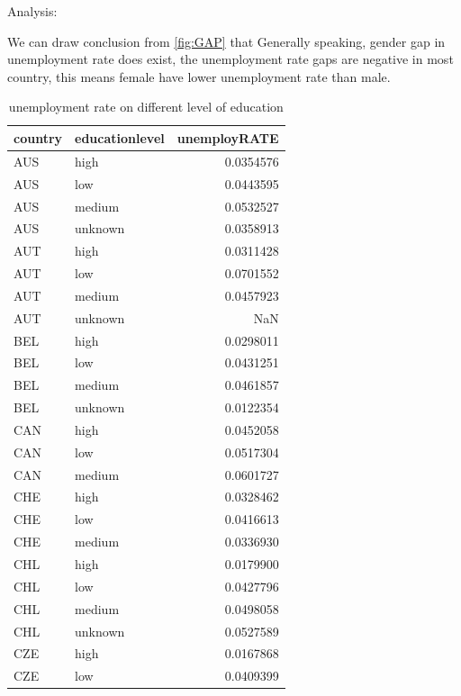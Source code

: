 \documentclass[11pt,a4paper,]{article}
\begin{document}
Analysis:

We can draw conclusion from \ref{fig:GAP} that Generally speaking, gender gap in unemployment rate does exist, the unemployment rate gaps are negative in most country, this means female have lower unemployment rate than male.

\begin{table}[H]

\caption{\label{tab:unnamed-chunk-11}unemployment rate on different level of education}
\centering
\begin{tabular}[t]{l|l|r}
\hline
country & educationlevel & unemployRATE\\
\hline
\rowcolor{gray!6}  AUS & high & 0.0354576\\
\hline
AUS & low & 0.0443595\\
\hline
\rowcolor{gray!6}  AUS & medium & 0.0532527\\
\hline
AUS & unknown & 0.0358913\\
\hline
\rowcolor{gray!6}  AUT & high & 0.0311428\\
\hline
AUT & low & 0.0701552\\
\hline
\rowcolor{gray!6}  AUT & medium & 0.0457923\\
\hline
AUT & unknown & NaN\\
\hline
\rowcolor{gray!6}  BEL & high & 0.0298011\\
\hline
BEL & low & 0.0431251\\
\hline
\rowcolor{gray!6}  BEL & medium & 0.0461857\\
\hline
BEL & unknown & 0.0122354\\
\hline
\rowcolor{gray!6}  CAN & high & 0.0452058\\
\hline
CAN & low & 0.0517304\\
\hline
\rowcolor{gray!6}  CAN & medium & 0.0601727\\
\hline
CHE & high & 0.0328462\\
\hline
\rowcolor{gray!6}  CHE & low & 0.0416613\\
\hline
CHE & medium & 0.0336930\\
\hline
\rowcolor{gray!6}  CHL & high & 0.0179900\\
\hline
CHL & low & 0.0427796\\
\hline
\rowcolor{gray!6}  CHL & medium & 0.0498058\\
\hline
CHL & unknown & 0.0527589\\
\hline
\rowcolor{gray!6}  CZE & high & 0.0167868\\
\hline
CZE & low & 0.0409399\\

\end{tabular}
\end{table}
\end{document}
